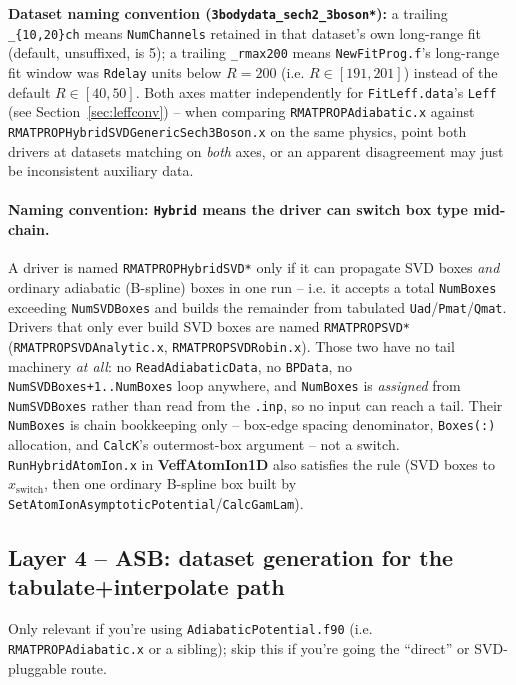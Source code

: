 \documentclass[11pt]{article}
\newcommand{\file}[1]{\texttt{#1}}
\newcommand{\sub}[1]{\texttt{#1}}
\newcommand{\repo}[1]{\textbf{#1}}
\begin{document}
\textbf{Dataset naming convention (\texttt{3bodydata\_sech2\_3boson*}):} a trailing
\texttt{\_\{10,20\}ch} means \texttt{NumChannels} retained in that dataset's own long-range fit
(default, unsuffixed, is 5); a trailing \texttt{\_rmax200} means \texttt{NewFitProg.f}'s long-range
fit window was \texttt{Rdelay} units below $R{=}200$ (i.e. $R\in[191,201]$) instead of the default
$R\in[40,50]$. Both axes matter independently for \texttt{FitLeff.data}'s \texttt{Leff} (see
Section~\ref{sec:leffconv}) -- when comparing \file{RMATPROPAdiabatic.x} against
\file{RMATPROPHybridSVDGenericSech3Boson.x} on the same physics, point both drivers at datasets
matching on \emph{both} axes, or an apparent disagreement may just be inconsistent auxiliary data.

\paragraph{Naming convention: \texttt{Hybrid} means the driver can switch box type mid-chain.}
A driver is named \file{RMATPROPHybridSVD*} only if it can propagate SVD boxes \emph{and} ordinary
adiabatic (B-spline) boxes in one run -- i.e. it accepts a total \texttt{NumBoxes} exceeding
\texttt{NumSVDBoxes} and builds the remainder from tabulated \texttt{Uad}/\texttt{Pmat}/\texttt{Qmat}.
Drivers that only ever build SVD boxes are named \file{RMATPROPSVD*}
(\file{RMATPROPSVDAnalytic.x}, \file{RMATPROPSVDRobin.x}). Those two have no tail machinery
\emph{at all}: no \sub{ReadAdiabaticData}, no \texttt{BPData}, no
\texttt{NumSVDBoxes+1..NumBoxes} loop anywhere, and \texttt{NumBoxes} is \emph{assigned} from
\texttt{NumSVDBoxes} rather than read from the \texttt{.inp}, so no input can reach a tail. Their
\texttt{NumBoxes} is chain bookkeeping only -- box-edge spacing denominator, \texttt{Boxes(:)}
allocation, and \sub{CalcK}'s outermost-box argument -- not a switch. \file{RunHybridAtomIon.x}
in \repo{VeffAtomIon1D} also satisfies the rule (SVD boxes to $x_{\text{switch}}$, then one ordinary
B-spline box built by \sub{SetAtomIonAsymptoticPotential}/\sub{CalcGamLam}).

\subsection{Layer 4 -- ASB: dataset generation for the tabulate+interpolate path}

Only relevant if you're using \file{AdiabaticPotential.f90} (i.e. \file{RMATPROPAdiabatic.x} or a
sibling); skip this if you're going the ``direct'' or SVD-pluggable route.
\end{document}
